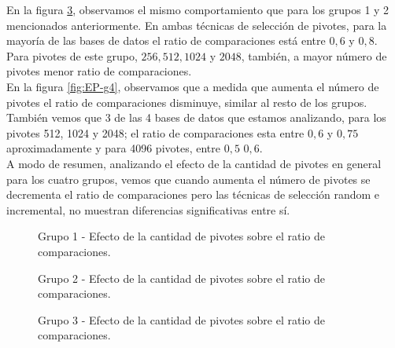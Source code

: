 En la figura \ref{fig:EP-g3}, observamos el mismo comportamiento que para los grupos 1 y 2 mencionados anteriormente. En ambas t\'ecnicas de selecci\'on de pivotes, para la mayor\'ia de las bases de datos el ratio de comparaciones est\'a entre $0,6$ y $0,8$. Para pivotes de este grupo, $256, 512, 1024$ y $2048$, tambi\'en, a mayor n\'umero de pivotes menor ratio de comparaciones.\\

En la figura \ref{fig:EP-g4}, observamos que a medida que aumenta el n\'umero de pivotes el ratio de comparaciones disminuye, similar al resto de los grupos. Tambi\'en vemos que 3 de las 4 bases de datos que estamos analizando, para los pivotes 512, 1024 y 2048; el ratio de comparaciones esta entre $0,6$ y $0,75$ aproximadamente y para 4096 pivotes, entre $0,5$ $0,6$.\\

A modo de resumen, analizando el efecto de la cantidad de pivotes en general para los cuatro grupos, vemos que cuando aumenta el n\'umero de pivotes se decrementa el ratio de comparaciones pero las t\'ecnicas de selecci\'on random e incremental, no muestran diferencias significativas entre s\'i.

\begin{figure}[tb]
\centering
{}
		\caption{\small Grupo 1 - Efecto de la cantidad de pivotes sobre el ratio de comparaciones.}
		\label{fig:EP-g1}
\end{figure}

\begin{figure}[H]
\centering
{}
		\caption{\small Grupo 2 - Efecto de la cantidad de pivotes sobre el ratio de comparaciones.}
		\label{fig:EP-g2}
\end{figure}

\begin{figure}[tb]
\centering
{}
		\caption{\small Grupo 3 - Efecto de la cantidad de pivotes sobre el ratio de comparaciones.}
		\label{fig:EP-g3}
\end{figure}

